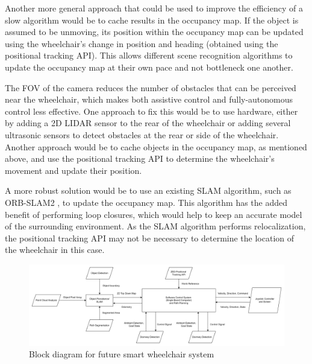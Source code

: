 Another more general approach that could be used to improve the
efficiency of a slow algorithm would be to cache results in the occupancy map.
If the object is assumed to be unmoving, its position within the occupancy
map can be updated using the wheelchair's change in position and heading
(obtained using the positional tracking API). This allows different scene recognition
algorithms to update the occupancy map at their own pace and not bottleneck
one another.

The FOV of the camera reduces the number of obstacles that can be perceived near the wheelchair,
which makes both assistive control and fully-autonomous control less effective. One approach
to fix this would be to use hardware, either by adding a 2D LIDAR sensor to the rear of the
wheelchair or adding several ultrasonic sensors to detect obstacles at the rear or side
of the wheelchair. Another approach would be to cache objects in the occupancy map,
as mentioned above, and use the positional tracking API to determine the
wheelchair's movement and update their position.

A more robust solution would be
to use an existing SLAM algorithm, such as ORB-SLAM2 \cite{mur-artalORBSLAM2OpenSourceSLAM2017},
to update the occupancy map. This algorithm has the added benefit of performing
loop closures, which would help to keep an accurate model of the surrounding environment.
As the SLAM algorithm performs relocalization, the positional tracking API may not
be necessary to determine the location of the wheelchair in this case.

\begin{figure}[b]
    \centering
    \includegraphics[width=\linewidth]{images/top_level_software_pipeline.png}
    \caption{Block diagram for future smart wheelchair system}
    \label{fig:top_level_software_pipeline}
\end{figure}


